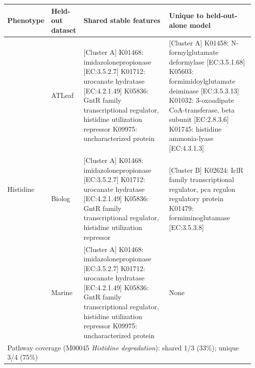 \begin{table}[h]
\centering
\small
\begin{tabular}{|l|l|p{4.4cm}|p{4.4cm}|}
\hline
\textbf{Phenotype} & \textbf{Held-out dataset} & \textbf{Shared stable features} & \textbf{Unique to held-out-alone model} \\
\hline
\multirow{3}{*}{Histidine} & ATLeaf & [Cluster A] K01468: imidazolonepropionase [EC:3.5.2.7] \newline [Cluster A] K01712: urocanate hydratase [EC:4.2.1.49] \newline K05836: GntR family transcriptional regulator, histidine utilization repressor \newline K09975: uncharacterized protein & [Cluster A] K01458: N-formylglutamate deformylase [EC:3.5.1.68] \newline [Cluster A] K05603: formimidoylglutamate deiminase [EC:3.5.3.13] \newline [Cluster B] K01032: 3-oxoadipate CoA-transferase, beta subunit [EC:2.8.3.6] \newline K01745: histidine ammonia-lyase [EC:4.3.1.3] \\
 & Biolog & [Cluster A] K01468: imidazolonepropionase [EC:3.5.2.7] \newline [Cluster A] K01712: urocanate hydratase [EC:4.2.1.49] \newline K05836: GntR family transcriptional regulator, histidine utilization repressor & [Cluster B] K02624: IclR family transcriptional regulator, pca regulon regulatory protein \newline K01479: formiminoglutamase [EC:3.5.3.8] \\
 & Marine & [Cluster A] K01468: imidazolonepropionase [EC:3.5.2.7] \newline [Cluster A] K01712: urocanate hydratase [EC:4.2.1.49] \newline K05836: GntR family transcriptional regulator, histidine utilization repressor \newline K09975: uncharacterized protein & None \\
\multicolumn{4}{|l|}{\footnotesize Pathway coverage (M00045 \textit{Histidine degradation}): shared 1/3 (33\%); unique 3/4 (75\%)} \\
\hline
\end{tabular}

\end{table}

